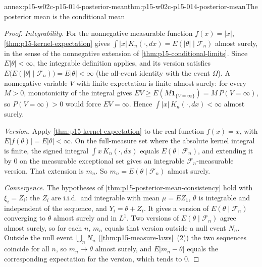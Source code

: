 \begin{annexitem}{annex:p15-w02c-p15-014-posterior-mean}{thm:p15-w02c-p15-014-posterior-mean}{The posterior mean is the conditional mean}
\begin{proof}
\emph{Integrability.} For the nonnegative measurable function
\(f(x)=|x|\), \cref{thm:p15-kernel-expectation} gives
\(\int|x|\,K_n(\cdot,dx)=E(|\theta|\mid\mathcal F_n)\) almost surely, in
the sense of the nonnegative extension of \cref{thm:p15-conditional-limits}.
Since \(E|\theta|<\infty\), the integrable definition applies, and its
version satisfies
\(E\bigl(E(|\theta|\mid\mathcal F_n)\bigr)=E|\theta|<\infty\) (the
all-event identity with the event \(\Omega\)). A nonnegative variable \(V\) with finite expectation is finite almost
surely: for every \(M>0\), monotonicity of the integral gives
\(EV\geq E(M\mathbf1_{\{V=\infty\}})=M\,P(V=\infty)\), so
\(P(V=\infty)>0\) would force \(EV=\infty\). Hence \(\int|x|\,K_n(\cdot,dx)<\infty\) almost surely.

\emph{Version.} Apply \cref{thm:p15-kernel-expectation} to the real
function \(f(x)=x\), with \(E|f(\theta)|=E|\theta|<\infty\). On the
full-measure set where the absolute kernel integral is finite, the signed
integral \(\int x\,K_n(\cdot,dx)\) equals \(E(\theta\mid\mathcal F_n)\),
and extending it by 0 on the measurable exceptional set gives an
integrable \(\mathcal F_n\)-measurable version. That extension is
\(m_n\). So \(m_n=E(\theta\mid\mathcal F_n)\) almost surely.

\emph{Convergence.} The hypotheses of
\cref{thm:p15-posterior-mean-consistency} hold with \(\xi_i=Z_i\): the
\(Z_i\) are i.i.d.\ and integrable with mean \(\mu=EZ_1\), \(\theta\) is
integrable and independent of the sequence, and \(Y_i=\theta+Z_i\). It
gives a version of \(E(\theta\mid\mathcal F_n)\) converging to
\(\theta\) almost surely and in \(L^1\). Two versions of
\(E(\theta\mid\mathcal F_n)\) agree almost surely, so for each \(n\),
\(m_n\) equals that version outside a null event \(N_n\). Outside the
null event \(\bigcup_nN_n\) (\cref{thm:p15-measure-laws}~(2)) the two
sequences coincide for all \(n\), so \(m_n\to\theta\) almost surely, and
\(E|m_n-\theta|\) equals the corresponding expectation for the version,
which tends to 0.
\end{proof}
\end{annexitem}
